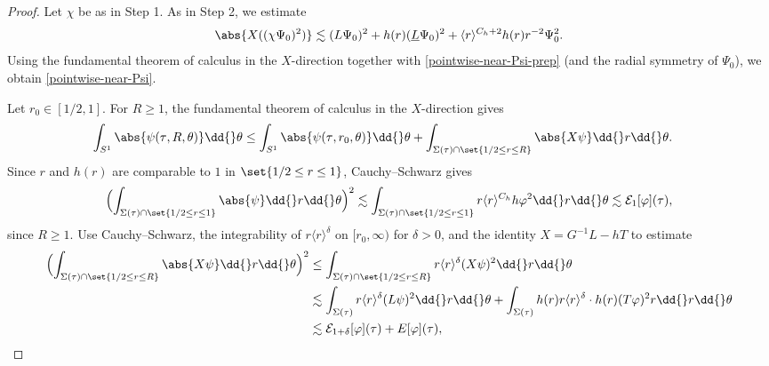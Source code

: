 \documentclass[10pt, reqno]{amsart}
\begin{document}
\begin{proof}
 Let \(\chi{}\) be as in Step 1. As in Step
2, we estimate
\begin{equation}\label{pointwise-near-Psi-prep}
\abs{X((\chi{}\Psi{}_0)^2)}\lesssim (L\Psi{}_0)^2 + h(r)(\underline{L}\Psi{}_0)^2 + \langle{}r\rangle^{C_h+2}h(r)r^{-2}\Psi{}_0^2.
\end{equation}
Using the fundamental theorem of calculus in the \(X\)-direction together with
\cref{pointwise-near-Psi-prep} (and the
radial symmetry of \(\Psi_0\)), we obtain \cref{pointwise-near-Psi}.

 Let \(r_0\in [1/2,1]\). For \(R\ge 1\), the
fundamental theorem of calculus in the \(X\)-direction gives
\begin{equation}\label{pointwise-far-prep-1}
\begin{split}
\int _{S^1}\abs{\psi{}(\tau{},R,\theta{})}\dd{}\theta{}&\le \int _{S^1}\abs{\psi{}(\tau{},r_0,\theta{})}\dd{}\theta{} + \int _{\Sigma{}(\tau{})\cap \set{1/2\le r\le R}} \abs{X\psi{}}\dd{}r\dd{}\theta{}.
\end{split}
\end{equation}
Since \(r\) and \(h(r)\) are comparable to \(1\) in \(\set{1/2\le r\le 1}\),
Cauchy--Schwarz gives
\begin{equation}\label{pointwise-far-prep-0}
\Bigl(\int _{\Sigma{}(\tau{})\cap \set{1/2\le r\le 1}}\abs{\psi{}}\dd{}r\dd{}\theta{}\Bigr)^2\lesssim \int _{\Sigma{}(\tau{})\cap \set{1/2\le r\le 1}}r\langle{}r\rangle^{C_h}h\varphi^2\dd{}r\dd{}\theta{}\lesssim \mathcal{E}_1[\varphi{}](\tau{}),
\end{equation}
since \(R\ge 1\). Use Cauchy--Schwarz, the integrability of
\(r\langle{}r\rangle^\delta{}\) on \([r_0,\infty)\) for \(\delta{} > 0\), and
the identity \(X = G^{-1}L - hT\) to estimate
\begin{equation}\label{pointwise-far-prep-2}
\begin{split}
\Bigl(\int _{\Sigma{}(\tau{})\cap \set{1/2\le r\le R}} \abs{X\psi{}}\dd{}r\dd{}\theta{}\Bigr)^2&\le \int _{\Sigma{}(\tau{})\cap \set{1/2\le r\le R}} r\langle{}r\rangle^\delta{}(X\psi{})^2\dd{}r\dd{}\theta{}\\
&\lesssim \int _{\Sigma{}(\tau{})} r\langle{}r\rangle^\delta{}(L\psi{})^2\dd{}r\dd{}\theta{} + \int _{\Sigma{}(\tau{})} h(r)r\langle{}r\rangle^\delta{}\cdot h(r)(T\varphi{})^2r\dd{}r\dd{}\theta{} \\
&\lesssim \mathcal{E}_{1+\delta{}}[\varphi{}](\tau{}) + E[\varphi{}](\tau{}),
\end{split}

\end{equation}
\end{proof}
\end{document}
